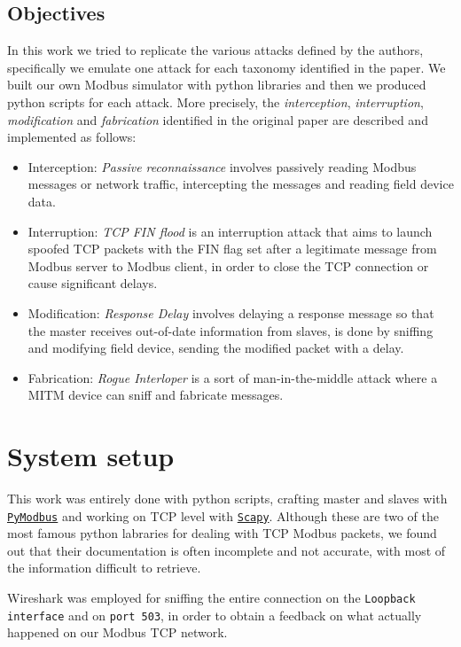 \documentclass[12pt]{article}
\begin{document}
\subsection{Objectives}
In this work we tried to replicate the various attacks defined by the authors, 
specifically we emulate one attack for each taxonomy identified in the paper. 
We built our own Modbus simulator with python libraries and then we produced python scripts for each attack.
More precisely, the \textit{interception}, \textit{interruption}, \textit{modification} and 
\textit{fabrication} identified in the original paper are described and implemented as follows:
\begin{itemize}
    \item Interception: \textit{Passive reconnaissance} involves passively reading Modbus messages or network traffic, intercepting the messages and reading field device data.
    \item Interruption: \textit{TCP FIN flood} is an interruption attack that aims to launch spoofed TCP packets with the FIN flag set after a legitimate message from Modbus server to Modbus client, in order to close the TCP connection or cause 
    significant delays.
    \item Modification: \textit{Response Delay} involves delaying a response message so that the master 
    receives out-of-date information from slaves, 
    is done by sniffing and modifying field device, sending the modified packet with a delay.
    \item Fabrication: \textit{Rogue Interloper} is a sort of man-in-the-middle attack where a MITM device can sniff and fabricate messages.
\end{itemize}

\section{System setup}
This work was entirely done with python scripts, crafting master and slaves with \href{https://pymodbus.readthedocs.io/en/latest/}{\texttt{PyModbus}} and working on TCP level with \href{https://scapy.readthedocs.io/en/latest/}{\texttt{Scapy}}.
Although these are two of the most famous python labraries for dealing with TCP Modbus packets, we found out that their documentation is often incomplete and not accurate, with most of the 
information difficult to retrieve. 

Wireshark was employed for sniffing the entire connection on the \texttt{Loopback interface} and on \texttt{port 503}, in order to obtain a feedback on what actually happened on our Modbus TCP network.
\end{document}

